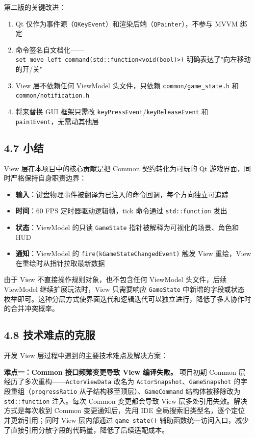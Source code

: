 \documentclass[12pt,fontset=none]{ctexart}
\begin{document}
第二版的关键改进：
\begin{enumerate}
\item Qt 仅作为事件源（\texttt{QKeyEvent}）和渲染后端（\texttt{QPainter}），不参与 MVVM 绑定
\item 命令签名自文档化——\texttt{set\_move\_left\_command(std::function<void(bool)>)} 明确表达了"向左移动的开/关"
\item View 层不依赖任何 ViewModel 头文件，只依赖 \texttt{common/game\_state.h} 和 \texttt{common/notification.h}
\item 将来替换 GUI 框架只需改 \texttt{keyPressEvent}/\texttt{keyReleaseEvent} 和 \texttt{paintEvent}，无需动其他层
\end{enumerate}


\subsection{4.7 小结}

View 层在本项目中的核心贡献是把 Common 契约转化为可玩的 Qt 游戏界面，同时严格保持自身职责边界：

\begin{itemize}
\item \textbf{输入}：键盘物理事件被翻译为已注入的命令回调，每个方向独立可追踪
\item \textbf{时间}：60 FPS 定时器驱动逻辑帧，tick 命令通过 \texttt{std::function} 发出
\item \textbf{状态}：ViewModel 的只读 \texttt{GameState} 指针被解释为可视化的场景、角色和 HUD
\item \textbf{通知}：ViewModel 的 \texttt{fire(kGameStateChangedEvent)} 触发 View 重绘，View 在重绘时从指针拉取最新数据
\end{itemize}

由于 View 不直接操作规则对象，也不包含任何 ViewModel 头文件，后续 ViewModel 继续扩展玩法时，View 只需要响应 \texttt{GameState} 中新增的字段或状态枚举即可。这种分层方式使界面迭代和逻辑迭代可以独立进行，降低了多人协作时的合并冲突概率。


\subsection{4.8 技术难点的克服}

开发 View 层过程中遇到的主要技术难点及解决方案：

\textbf{难点一：Common 接口频繁变更导致 View 编译失败。} 项目初期 Common 层经历了多次重构——\texttt{ActorViewData} 改名为 \texttt{ActorSnapshot}、\texttt{GameSnapshot} 的字段重组（\texttt{progressRatio} 从子结构移至顶层）、\texttt{GameCommand} 结构体被移除改为 \texttt{std::function} 注入。每次 Common 变更都会导致 View 层多处引用失效。解决方式是每次收到 Common 变更通知后，先用 IDE 全局搜索旧类型名，逐个定位并更新引用；同时 View 层内部通过 \texttt{game\_state()} 辅助函数统一访问入口，减少了直接引用分散字段的代码量，降低了后续适配成本。
\end{document}
